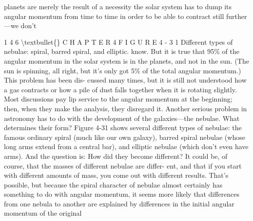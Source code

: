 \documentclass[10pt,oneside]{article}
\begin{document}
planets are merely the result of a necessity the solar system has to dump its angular momentum from time to time in order to be able to contract still further---we don’t\par

1 4 6 \textbackslash{}textbullet\{\} C H A P T E R  4 F I G U R E  4 - 3 1 Different types of nebulae: spiral, barred spiral, and elliptic. know. But it is true that 95\% of the angular momentum in the solar system is in the planets, and not in the sun. (The sun is spinning, all right, but it’s only got 5\% of the total angular momentum.) This problem has been dis- cussed many times, but it is still not understood how a gas contracts or how a pile of dust falls together when it is rotating slightly. Most discussions pay lip service to the angular momentum at the beginning; then, when they make the analysis, they disregard it. Another serious problem in astronomy has to do with the development of the galaxies---the nebulae. What determines their form? Figure 4-31 shows several different types of nebulae: the famous ordinary spiral (much like our own galaxy), barred spiral nebulae (whose long arms extend from a central bar), and elliptic nebulae (which don’t even have arms). And the question is: How did they become different? It could be, of course, that the masses of different nebulae are differ- ent, and that if you start with different amounts of mass, you come out with different results. That’s possible, but because the spiral character of nebulae almost certainly has something to do with angular momentum, it seems more likely that differences from one nebula to another are explained by differences in the initial angular momentum of the original\par
\end{document}
